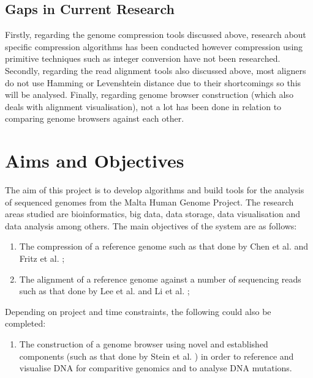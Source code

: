 \documentclass{csfyp}
\begin{document}
\subsection{Gaps in Current Research}\vspace{-2ex}
Firstly, regarding the genome compression tools discussed above, research about specific compression algorithms has been conducted however compression using primitive techniques such as integer conversion have not been researched.
Secondly, regarding the read alignment tools also discussed above,  most aligners do not use Hamming or Levenshtein distance due to their shortcomings so this will be analysed.  Finally, regarding genome browser construction (which also deals with alignment visualisation), not a lot has been done in relation to comparing genome browsers against each other.     

\section{Aims and Objectives}\vspace{-2ex}

The aim of this project is to develop algorithms and build tools for the analysis of sequenced genomes from the Malta Human Genome Project.  The research areas studied are bioinformatics, big data, data storage, data visualisation and data analysis among others.  The main objectives of the system are as follows:

\begin{enumerate}[nolistsep]

   \item The compression of a reference genome such as that done by Chen et al. \cite{gencompress} and Fritz et al. \cite{refcompression};

  \item The alignment of a reference genome against a number of sequencing reads such as that done by Lee et al. \cite{cgreads} and Li et al. \cite{bwtransform};

\end{enumerate}

Depending on project and time constraints, the following could also be completed:

\begin{enumerate}[nolistsep]

  \item The construction of a genome browser using novel and established components (such as that done by Stein et al. \cite{genericbrowser}) in order to reference and visualise DNA for comparitive genomics and to analyse DNA mutations.

\end{enumerate}
\end{document}
